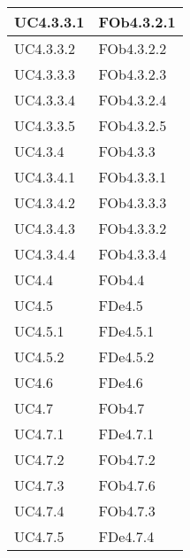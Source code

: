 \begin{longtable}{|l|p{4cm}|}
\hline
		UC4.3.3.1 & FOb4.3.2.1 \linebreak   \\
\hline
		UC4.3.3.2 & FOb4.3.2.2 \linebreak   \\
\hline
		UC4.3.3.3 & FOb4.3.2.3 \linebreak   \\
\hline
		UC4.3.3.4 & FOb4.3.2.4 \linebreak   \\
\hline
		UC4.3.3.5 & FOb4.3.2.5 \linebreak   \\
\hline
		UC4.3.4 & FOb4.3.3 \linebreak   \\
\hline
		UC4.3.4.1 & FOb4.3.3.1 \linebreak   \\
\hline
		UC4.3.4.2 & FOb4.3.3.3 \linebreak   \\
\hline
		UC4.3.4.3 & FOb4.3.3.2 \linebreak   \\
\hline
		UC4.3.4.4 & FOb4.3.3.4 \linebreak   \\
\hline
		UC4.4 & FOb4.4 \linebreak   \\
\hline
		UC4.5 & FDe4.5 \linebreak   \\
\hline
		UC4.5.1 & FDe4.5.1 \linebreak   \\
\hline
		UC4.5.2 & FDe4.5.2 \linebreak   \\
\hline
		UC4.6 & FDe4.6 \linebreak   \\
\hline
		UC4.7 & FOb4.7 \linebreak   \\
\hline
		UC4.7.1 & FDe4.7.1 \linebreak   \\
\hline
		UC4.7.2 & FOb4.7.2 \linebreak   \\
\hline
		UC4.7.3 & FOb4.7.6 \linebreak   \\
\hline
		UC4.7.4 & FOb4.7.3 \linebreak   \\
\hline
		UC4.7.5 & FDe4.7.4 \linebreak   \\

\end{longtable}

